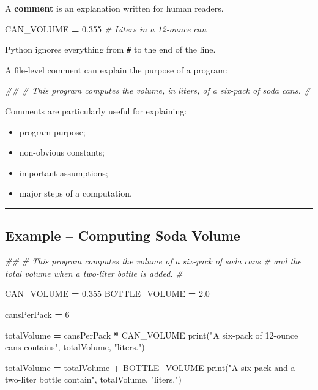\documentclass[
]{article}
\newenvironment{Shaded}{\begin{snugshade}}{\end{snugshade}}
\newcommand{\BuiltInTok}[1]{#1}
\newcommand{\CommentTok}[1]{\textcolor[rgb]{0.56,0.35,0.01}{\textit{#1}}}
\newcommand{\DecValTok}[1]{\textcolor[rgb]{0.00,0.00,0.81}{#1}}
\newcommand{\FloatTok}[1]{\textcolor[rgb]{0.00,0.00,0.81}{#1}}
\newcommand{\NormalTok}[1]{#1}
\newcommand{\OperatorTok}[1]{\textcolor[rgb]{0.81,0.36,0.00}{\textbf{#1}}}
\newcommand{\StringTok}[1]{\textcolor[rgb]{0.31,0.60,0.02}{#1}}
\providecommand{\tightlist}{%
  \setlength{\itemsep}{0pt}\setlength{\parskip}{0pt}}
\begin{document}
A \textbf{comment} is an explanation written for human readers.

\begin{Shaded}
\begin{Highlighting}[]
\NormalTok{CAN\_VOLUME }\OperatorTok{=} \FloatTok{0.355}  \CommentTok{\# Liters in a 12{-}ounce can}
\end{Highlighting}
\end{Shaded}

Python ignores everything from \texttt{\#} to the end of the line.

A file-level comment can explain the purpose of a program:

\begin{Shaded}
\begin{Highlighting}[]
\CommentTok{\#\#}
\CommentTok{\# This program computes the volume, in liters, of a six{-}pack of soda cans.}
\CommentTok{\#}
\end{Highlighting}
\end{Shaded}

Comments are particularly useful for explaining:

\begin{itemize}
\tightlist
\item
  program purpose;
\item
  non-obvious constants;
\item
  important assumptions;
\item
  major steps of a computation.
\end{itemize}

\begin{center}\rule{0.5\linewidth}{0.5pt}\end{center}

\subsection{Example -- Computing Soda
Volume}\label{example-computing-soda-volume}

\begin{Shaded}
\begin{Highlighting}[]
\CommentTok{\#\#}
\CommentTok{\# This program computes the volume of a six{-}pack of soda cans}
\CommentTok{\# and the total volume when a two{-}liter bottle is added.}
\CommentTok{\#}

\NormalTok{CAN\_VOLUME }\OperatorTok{=} \FloatTok{0.355}
\NormalTok{BOTTLE\_VOLUME }\OperatorTok{=} \FloatTok{2.0}

\NormalTok{cansPerPack }\OperatorTok{=} \DecValTok{6}

\NormalTok{totalVolume }\OperatorTok{=}\NormalTok{ cansPerPack }\OperatorTok{*}\NormalTok{ CAN\_VOLUME}
\BuiltInTok{print}\NormalTok{(}\StringTok{"A six{-}pack of 12{-}ounce cans contains"}\NormalTok{, totalVolume, }\StringTok{"liters."}\NormalTok{)}

\NormalTok{totalVolume }\OperatorTok{=}\NormalTok{ totalVolume }\OperatorTok{+}\NormalTok{ BOTTLE\_VOLUME}
\BuiltInTok{print}\NormalTok{(}\StringTok{"A six{-}pack and a two{-}liter bottle contain"}\NormalTok{, totalVolume, }\StringTok{"liters."}\NormalTok{)}
\end{Highlighting}
\end{Shaded}
\end{document}
